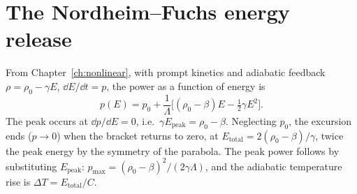 \section{The Nordheim--Fuchs energy release}

From Chapter~\ref{ch:nonlinear}, with prompt kinetics and adiabatic feedback
$\rho=\rho_0-\gamma E$, $\dd E/\dd t=p$, the power as a function of energy is
\begin{equation}
p(E)=p_0+\frac{1}{\Lambda}\Big[(\rho_0-\beta)E-\tfrac12\gamma E^2\Big].
\end{equation}
The peak occurs at $\dd p/\dd E=0$, i.e.\ $\gamma E_{\text{peak}}=\rho_0-\beta$.
Neglecting $p_0$, the excursion ends ($p\to 0$) when the bracket returns to zero,
at $E_{\text{total}}=2(\rho_0-\beta)/\gamma$, twice the peak energy by the symmetry
of the parabola. The peak power follows by substituting $E_{\text{peak}}$:
$p_{\max}=(\rho_0-\beta)^2/(2\gamma\Lambda)$, and the adiabatic temperature rise is
$\Delta T = E_{\text{total}}/C$.
